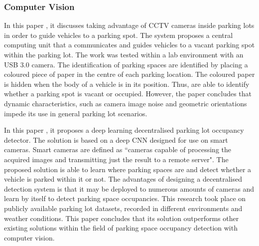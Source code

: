\subsubsection*{Computer Vision}
In this paper \citep{cho_automatic_2016}, it discusses taking advantage of CCTV cameras inside parking lots in order to guide vehicles to a parking spot. The system proposes a central computing unit that a communicates and guides vehicles to a vacant parking spot within the parking lot. The work was tested within a lab environment with an USB 3.0 camera. The identification of parking spaces are identified by placing a coloured piece of paper in the centre of each parking location. The coloured paper is hidden when the body of a vehicle is in its position. Thus, are able to  identify whether a parking spot is vacant or occupied. However, the paper concludes that dynamic characteristics, such as camera image noise and geometric orientations impede its use in general parking lot scenarios.

In this paper \citep{amato_deep_2017}, it proposes a deep learning decentralised parking lot occupancy detector. The solution is based on a deep \ac{CNN} designed for use on smart cameras. Smart cameras are defined as ``cameras capable of processing the acquired images and transmitting just the result to a remote server". The proposed solution is able to learn where parking spaces are and detect whether a vehicle is parked within it or not. The advantages of designing a decentralised detection system is that it may be deployed to numerous amounts of cameras and learn by itself to detect parking space occupancies. This research took place on publicly available parking lot datasets, recorded in different environments and weather conditions. This paper concludes that its solution outperforms other existing solutions within the field of parking space occupancy detection with computer vision.
